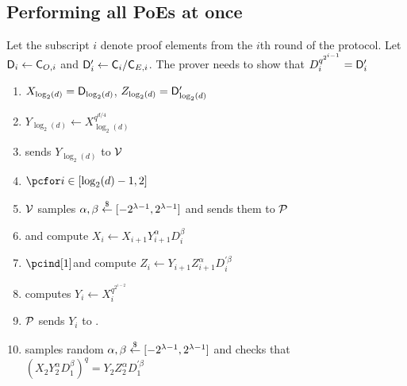 \documentclass[12pt]{article}
\begin{document}
\subsection{Performing all PoEs at once}
Let the subscript $i$ denote proof elements from the $i$th round of the protocol.
Let $\mathsf{D}_i\gets \mathsf{C}_{O,i}$ and $\mathsf{D}_i'\gets \mathsf{C}_i/\mathsf{C}_{E,i}$. The prover needs to show that $D_i^{q^{2^{i-1}}}=\mathsf{D}'_i$
\begin{enumerate}[nolistsep]
\item $X_{\log_2(d)}=\mathsf{D}_{\log_2(d)}$, $Z_{\log_2(d)}=\mathsf{D}'_{\log_2(d)}$
\item $Y_{\log_2(d)}\gets X_{\log_2(d)}^{q^{d/4}}$ 
\item \prover sends $Y_{\log_2(d)}$ to $\mathcal{V}$
	\item $\pcfor i \in [\log_2(d)-1,2]$
	\item \pcind[1]$\mathcal{V}$ samples $\alpha,\beta \overset{\$}{\gets} [-2^{\lambda-1} ,2^{\lambda-1}]$ and sends them to $\mathcal{P}$
	\item \pcind[1]\prover and \verifier compute  $X_{i}\gets  X_{i+1} Y_{i+1}^{\alpha}D_{i}^{\beta}$
	\item $\pcind[1]$\prover and \verifier compute   $Z_{i}\gets Y_{i+1}Z_{i+1}^{\alpha}D_{i}^{'\beta}$
		\item \pcind[1]\prover computes $Y_{i}\gets X_{i}^{q^{2^{i-2}}}$ 
		\item \pcind[1]$\mathcal{P}$ sends $Y_{i}$ to \verifier.
\item \verifier samples random $\alpha,\beta \overset{\$}{\gets} [-2^{\lambda-1} ,2^{\lambda-1}]$ and checks that $(X_{2} Y_{2}^{\alpha}D_{1}^{\beta})^q=Y_{2}Z_{2}^{\alpha}D_{1}^{'\beta}$
\end{enumerate}
\end{document}
